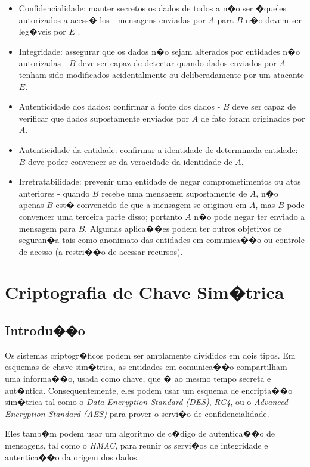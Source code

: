 \documentclass[a4paper,capchap,espacoduplo,normaltoc]{abntepusp}
\begin{document}
\begin{itemize}
\item Confidencialidade: manter secretos os dados de todos a n�o ser �queles autorizados a acess�-los - mensagens enviadas por $A$ para $B$ n�o devem ser leg�veis por $E$ .
\item Integridade: assegurar que os dados n�o sejam alterados por entidades n�o autorizadas - $B$ deve ser capaz de detectar quando dados enviados por $A$ tenham sido modificados acidentalmente ou deliberadamente por um atacante $E$.
\item Autenticidade dos dados: confirmar a fonte dos dados - $B$ deve ser capaz de verificar que dados supostamente enviados por $A$ de fato foram originados por $A$.
\item Autenticidade da entidade: confirmar a identidade de determinada entidade: $B$ deve poder convencer-se da veracidade da identidade de $A$.
\item Irretratabilidade: prevenir uma entidade de negar comprometimentos ou atos anteriores - quando $B$ recebe uma mensagem supostamente de $A$, n�o apenas $B$ est� convencido de que a mensagem se originou em $A$, mas $B$ pode convencer uma terceira parte disso; portanto $A$ n�o pode negar ter enviado a mensagem para $B$.
Algumas aplica��es podem ter outros objetivos de seguran�a tais como anonimato das entidades em comunica��o ou controle de acesso (a restri��o de acessar recursos).
\end{itemize}


\section{Criptografia de Chave Sim�trica}

\subsection{Introdu��o}

Os sistemas criptogr�ficos podem ser amplamente divididos em dois tipos. Em esquemas de chave sim�trica, as entidades em comunica��o compartilham uma informa��o, usada como chave, que � ao mesmo tempo secreta e aut�ntica. Consequentemente, eles podem usar um esquema de encripta��o sim�trica tal como o \emph{Data Encryption Standard (DES)}, \emph{RC4}, ou o \emph{Advanced Encryption Standard (AES)} para prover o servi�o de confidencialidade. 

Eles tamb�m podem usar um algoritmo de c�digo de autentica��o de mensagens, tal como o \emph{HMAC}, para reunir os servi�os de integridade e autentica��o da origem dos dados.
\end{document}

